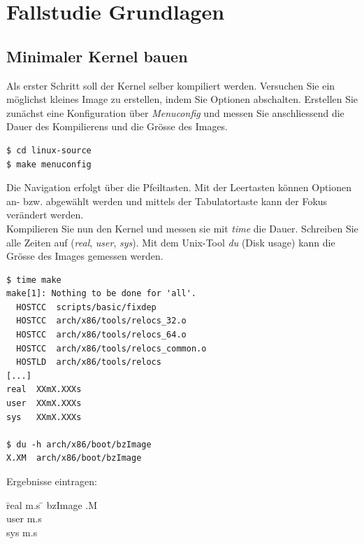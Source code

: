 \section{Fallstudie Grundlagen}

\subsection{Minimaler Kernel bauen}

Als erster Schritt soll der Kernel selber kompiliert werden. Versuchen Sie ein möglichst
kleines Image zu erstellen, indem Sie Optionen abschalten. Erstellen Sie zunächst eine 
Konfiguration über \emph{Menuconfig} und messen Sie anschliessend die Dauer des Kompilierens und
die Grösse des Images.

\begin{lstlisting}
$ cd linux-source
$ make menuconfig
\end{lstlisting}

Die Navigation erfolgt über die Pfeiltasten. Mit der Leertasten können Optionen an- bzw. abgewählt werden
und mittels der Tabulatortaste kann der Fokus verändert werden. \\

Kompilieren Sie nun den Kernel und messen sie mit \emph{time} die Dauer. Schreiben Sie alle Zeiten auf (\emph{real}, \emph{user}, \emph{sys}).
Mit dem Unix-Tool \emph{du} (Disk usage) kann die Grösse des Images gemessen werden.

\begin{lstlisting}
$ time make
make[1]: Nothing to be done for 'all'.
  HOSTCC  scripts/basic/fixdep
  HOSTCC  arch/x86/tools/relocs_32.o
  HOSTCC  arch/x86/tools/relocs_64.o
  HOSTCC  arch/x86/tools/relocs_common.o
  HOSTLD  arch/x86/tools/relocs
[...]
real  XXmX.XXXs
user  XXmX.XXXs
sys   XXmX.XXXs

$ du -h arch/x86/boot/bzImage 
X.XM  arch/x86/boot/bzImage

\end{lstlisting}
\hfill

Ergebnisse eintragen:
\begin{tabbing}
 \hspace{1cm}   \= real \hspace{0.2cm} \= \underline{\hspace{0.4cm}}m\underline{\hspace{0.4cm}}.\underline{\hspace{0.6cm}}s \= \hspace{0.2cm} bzImage \underline{\hspace{0.4cm}}.\underline{\hspace{0.2cm}}M \\
                \> user                \> \underline{\hspace{0.4cm}}m\underline{\hspace{0.4cm}}.\underline{\hspace{0.6cm}}s  \\
                \> sys                 \> \underline{\hspace{0.4cm}}m\underline{\hspace{0.4cm}}.\underline{\hspace{0.6cm}}s 
\end{tabbing}

